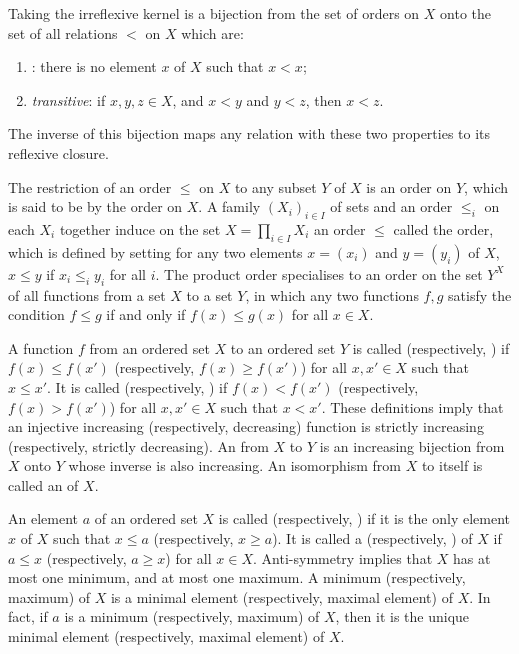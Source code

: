 \documentclass{article}
\begin{document}
Taking the irreflexive kernel is a bijection from the set of orders on
\(X\) onto the set of all relations \(<\) on \(X\) which are:
\begin{enumerate}
\item {}: there is no element \(x\) of \(X\) such
  that \(x < x\);
\item \emph{transitive}: if \(x,y,z \in X\), and \(x < y\) and
  \(y < z\), then \(x < z\).
\end{enumerate}
The inverse of this bijection maps any relation with these two
properties to its reflexive closure.

The restriction of an order \(\leq\) on \(X\) to any subset \(Y\) of
\(X\) is an order on \(Y\), which is said to be  by
the order on \(X\).  A family \((X_i)_{i \in I}\) of sets and an order
\(\leq_i\) on each \(X_i\) together induce on the set
\(X = \prod_{i \in I}X_i\) an order \(\leq\) called the
 order, which is defined by setting for any two
elements \(x= (x_i)\) and \(y = (y_i)\) of \(X\), \(x \leq y\) if
\(x_i \leq_i y_i\) for all \(i\).  The product order specialises to an
order on the set \(Y^X\) of all functions from a set \(X\) to a set
\(Y\), in which any two functions \(f,g\) satisfy the condition
\(f \leq g\) if and only if \(f(x) \leq g(x)\) for all \(x \in X\).

A function \(f\) from an ordered set \(X\) to an ordered set \(Y\) is
called  (respectively, )
if \(f(x) \leq f(x')\) (respectively, \(f(x) \geq f(x')\)) for all
\(x, x' \in X\) such that \(x \leq x'\).  It is called
 (respectively, ) if \(f(x) < f(x')\) (respectively, \(f(x) > f(x')\))
for all \(x, x' \in X\) such that \(x < x'\).  These definitions imply
that an injective increasing (respectively, decreasing) function is
strictly increasing (respectively, strictly decreasing).  An
 from \(X\) to \(Y\) is an increasing bijection
from \(X\) onto \(Y\) whose inverse is also increasing.  An
isomorphism from \(X\) to itself is called an 
of \(X\).

An element \(a\) of an ordered set \(X\) is called 
(respectively, ) if it is the only element \(x\) of
\(X\) such that \(x \leq a\) (respectively, \(x \geq a\)).  It is
called a  (respectively, ) of
\(X\) if \(a \leq x\) (respectively, \(a \geq x\)) for all
\(x \in X\).  Anti-symmetry implies that \(X\) has at most one
minimum, and at most one maximum.  A minimum (respectively, maximum)
of \(X\) is a minimal element (respectively, maximal element) of
\(X\).  In fact, if \(a\) is a minimum (respectively, maximum) of
\(X\), then it is the unique minimal element (respectively, maximal
element) of \(X\).
\end{document}
